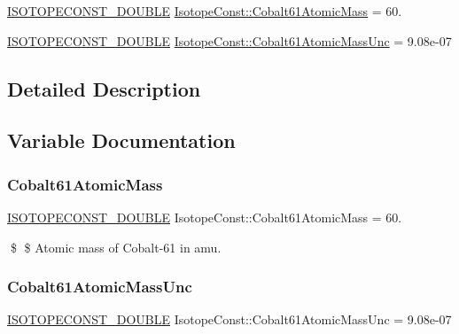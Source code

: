\begin{DoxyCompactItemize}
\item 
\mbox{\hyperlink{group___isotope_const-_macros_ga8f45a7272ce02c0b4c65c44636ed719a}{I\+S\+O\+T\+O\+P\+E\+C\+O\+N\+S\+T\+\_\+\+D\+O\+U\+B\+LE}} \mbox{\hyperlink{group___isotope_const-_cobalt-_co61_ga59704313e9d5b2ef4fec8972720b4e22}{Isotope\+Const\+::\+Cobalt61\+Atomic\+Mass}} = 60.
\item 
\mbox{\hyperlink{group___isotope_const-_macros_ga8f45a7272ce02c0b4c65c44636ed719a}{I\+S\+O\+T\+O\+P\+E\+C\+O\+N\+S\+T\+\_\+\+D\+O\+U\+B\+LE}} \mbox{\hyperlink{group___isotope_const-_cobalt-_co61_gad83fafb5628fdc72b7f073f60dfd3d0a}{Isotope\+Const\+::\+Cobalt61\+Atomic\+Mass\+Unc}} = 9.\+08e-\/07
\end{DoxyCompactItemize}


\subsection{Detailed Description}


\subsection{Variable Documentation}
\mbox{\label{group___isotope_const-_cobalt-_co61_ga59704313e9d5b2ef4fec8972720b4e22}} 
\subsubsection{\texorpdfstring{Cobalt61\+Atomic\+Mass}{Cobalt61AtomicMass}}
{\footnotesize\ttfamily \mbox{\hyperlink{group___isotope_const-_macros_ga8f45a7272ce02c0b4c65c44636ed719a}{I\+S\+O\+T\+O\+P\+E\+C\+O\+N\+S\+T\+\_\+\+D\+O\+U\+B\+LE}} Isotope\+Const\+::\+Cobalt61\+Atomic\+Mass = 60.}

\$ \$ Atomic mass of Cobalt-\/61 in amu. \mbox{\label{group___isotope_const-_cobalt-_co61_gad83fafb5628fdc72b7f073f60dfd3d0a}} 
\subsubsection{\texorpdfstring{Cobalt61\+Atomic\+Mass\+Unc}{Cobalt61AtomicMassUnc}}
{\footnotesize\ttfamily \mbox{\hyperlink{group___isotope_const-_macros_ga8f45a7272ce02c0b4c65c44636ed719a}{I\+S\+O\+T\+O\+P\+E\+C\+O\+N\+S\+T\+\_\+\+D\+O\+U\+B\+LE}} Isotope\+Const\+::\+Cobalt61\+Atomic\+Mass\+Unc = 9.\+08e-\/07}

